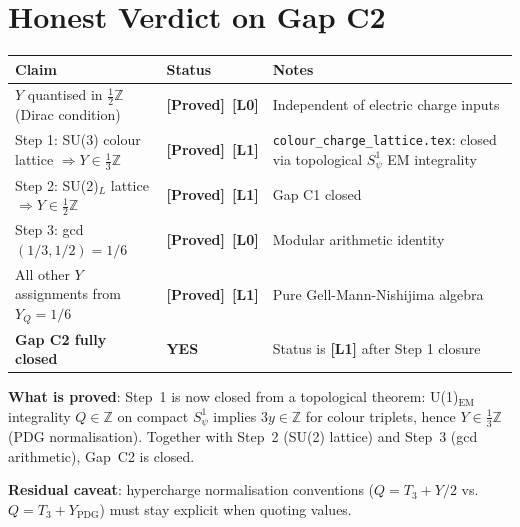 \documentclass[12pt,a4paper]{article}
\theoremstyle{definition}
\theoremstyle{remark}
\newcommand{\PROVED}{\textbf{[Proved]}}
\newcommand{\Lzero}{\textbf{[L0]}}
\newcommand{\Lone}{\textbf{[L1]}}
\newcommand{\ZZ}{\mathbb{Z}}
\begin{document}
\section{Honest Verdict on Gap C2}
\label{sec:verdict}

\begin{tcolorbox}[enhanced,colback=yellow!5!white,colframe=orange!60!black,
  arc=3pt,boxrule=1.2pt,title={\textbf{Honest Verdict: Gap C2 Status (2026-05-12)}}]

\begin{center}
\begin{tabular}{lll}
\toprule
\textbf{Claim} & \textbf{Status} & \textbf{Notes} \\
\midrule
$Y$ quantised in $\frac{1}{2}\ZZ$ (Dirac condition) & \PROVED\ \Lzero &
  Independent of electric charge inputs \\
Step 1: SU(3) colour lattice $\Rightarrow Y\in\frac{1}{3}\ZZ$ & \PROVED\ \Lone &
  \texttt{colour\_charge\_lattice.tex}: closed via topological $S^1_\psi$ EM integrality \\
Step 2: SU(2)$_L$ lattice $\Rightarrow Y\in\frac{1}{2}\ZZ$ & \PROVED\ \Lone &
  Gap C1 closed \\
Step 3: gcd$(1/3,1/2)=1/6$ & \PROVED\ \Lzero &
  Modular arithmetic identity \\
All other $Y$ assignments from $Y_Q = 1/6$ & \PROVED\ \Lone &
  Pure Gell-Mann-Nishijima algebra \\
\midrule
\textbf{Gap C2 fully closed} & \textbf{YES} &
  Status is \textbf{[L1]} after Step 1 closure \\
\bottomrule
\end{tabular}
\end{center}

\medskip
\textbf{What is proved}: Step~1 is now closed from a topological theorem:
U(1)$_{\mathrm{EM}}$ integrality $Q\in\ZZ$ on compact $S^1_\psi$ implies
$3y\in\ZZ$ for colour triplets, hence $Y\in\frac{1}{3}\ZZ$ (PDG normalisation).
Together with Step~2 (SU(2) lattice) and Step~3 (gcd arithmetic), Gap~C2 is closed.

\textbf{Residual caveat}: hypercharge normalisation conventions
($Q=T_3+Y/2$ vs.\ $Q=T_3+Y_{\mathrm{PDG}}$) must stay explicit when quoting values.
\end{tcolorbox}

\end{document}
